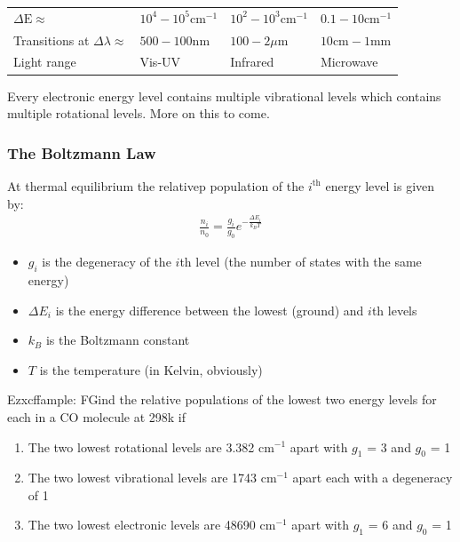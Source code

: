 \documentclass{article}
\begin{document}
    \begin{tabular}[2cm]{l l l l}
        \(\Delta \text{E} \approx \) \hspace{1cm}  & \(10^{4} - 10^{5} \text{cm}^{-1}\) \hspace{0.8cm} & \(10^{2} - 10^{3} \text{cm}^{-1}\) \hspace{0.8cm} & \(0.1 - 10 \text{cm}^{-1}\)\\
        Transitions at \(\Delta \lambda \approx \) & \(500 - 100 \text{nm}\) \hspace{0.5cm} & \(100 - 2 \mu \text{m} \) \hspace{0.5cm} & \(10 \text{cm} - 1 \text{mm}\)\\
        Light range & Vis-UV & Infrared & Microwave\\
    \end{tabular}

    \vspace{1cm}
    Every electronic energy level contains multiple vibrational levels which contains multiple rotational levels.
    More on this to come. 

    \subsubsection{The Boltzmann Law} At thermal equilibrium the relativep population of the \(i^{\text{th}}\) energy level is given by:
    \begin{align*}
        \frac{n_i}{n_0} = \frac{g_i}{g_0}e^{-\frac{\Delta E_i}{k_B T}}
    \end{align*}
    \begin{itemize}
        \item \(g_i\) is the degeneracy of the \(i\)th level (the number of states with the same energy)
        \item \(\Delta E_i\) is the energy difference between the lowest (ground) and \(i\)th levels
        \item \(k_B\) is the Boltzmann constant
        \item $T$ is the temperature (in Kelvin, obviously)
    \end{itemize}

    Ezxcffample: FGind the relative populations of the lowest two energy levels for each in a CO molecule at 298k if
    \begin{enumerate}
        \item The two lowest rotational levels are 3.382 cm$^{-1}$ apart with $g_1$ = 3 and $g_0$ = 1
        \item The two lowest vibrational levels are 1743 cm$^{-1}$ apart each with a degeneracy of 1
        \item The two lowest electronic levels are 48690 cm$^{-1}$ apart with $g_1$ = 6 and $g_0$ = 1
    \end{enumerate}
\end{document}
